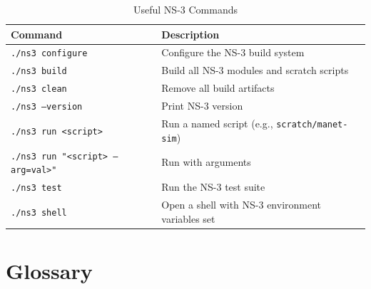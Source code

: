 \documentclass[12pt,a4paper]{article}
\newcommand{\cmd}[1]{\texttt{\color{codeblue}#1}}
\begin{document}
\begin{table}[H]
\centering
\caption{Useful NS-3 Commands}
\begin{tabularx}{\textwidth}{lX}
\toprule
\textbf{Command} & \textbf{Description} \\
\midrule
\cmd{./ns3 configure} & Configure the NS-3 build system \\
\cmd{./ns3 build}     & Build all NS-3 modules and scratch scripts \\
\cmd{./ns3 clean}     & Remove all build artifacts \\
\cmd{./ns3 --version} & Print NS-3 version \\
\cmd{./ns3 run <script>}        & Run a named script (e.g., \texttt{scratch/manet-sim}) \\
\cmd{./ns3 run "<script> --arg=val>"} & Run with arguments \\
\cmd{./ns3 test}      & Run the NS-3 test suite \\
\cmd{./ns3 shell}     & Open a shell with NS-3 environment variables set \\
\bottomrule
\end{tabularx}
\end{table}


\section{Glossary}
\end{document}
